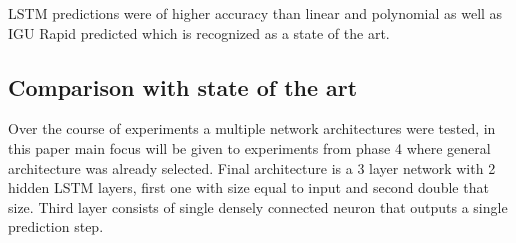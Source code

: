\documentclass{kybernetika}
\begin{document}
LSTM predictions were of higher accuracy than linear and polynomial as well as IGU Rapid
predicted which is recognized as a state of the art.

\subsection{Comparison with state of the art}
Over the course of experiments a multiple network architectures were tested, in this paper
main focus will be given to experiments from phase 4 where general architecture was already
selected.
Final architecture is a 3 layer network with 2 hidden LSTM layers, first one with size equal
to input and second double that size. Third layer consists of single densely connected neuron
that outputs a single prediction step.
\end{document}

